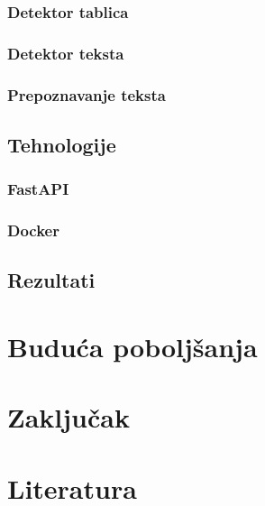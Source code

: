 \documentclass[a4paper,12pt,titlepage]{article}
\begin{document}
	\subsubsection{Detektor tablica}
	\subsubsection{Detektor teksta}
	\subsubsection{Prepoznavanje teksta}
	\subsection{Tehnologije}
	\subsubsection{FastAPI}
	\subsubsection{Docker}
	\subsection{Rezultati}
	\newpage
	
	\section{Buduća poboljšanja}
	\newpage
	
	\section{Zaključak}
	\newpage
	
	\section*{Literatura}
	\newpage
\end{document}
